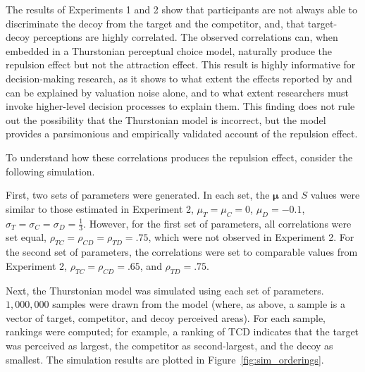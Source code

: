 The results of Experiments 1 and 2 show that participants are not always able to discriminate the decoy from the target and the competitor, and, that target-decoy perceptions are highly correlated. The observed correlations can, when embedded in a Thurstonian perceptual choice model, naturally produce the repulsion effect but not the attraction effect. This result is highly informative for decision-making research, as it shows to what extent the effects reported by \textcite{trueblood2013not} and \textcite{spektorWhenGoodLooks2018b} can be explained by valuation noise alone, and to what extent researchers must invoke higher-level decision processes to explain them. This finding does not rule out the possibility that the Thurstonian model is incorrect, but the model provides a parsimonious and empirically validated account of the repulsion effect.

To understand how these correlations produces the repulsion effect, consider the following simulation. 

First, two sets of parameters were generated. In each set, the $\boldsymbol{\mu}$ and $S$ values were similar to those estimated in Experiment 2, $\mu_{T}=\mu_{C}=0$, $\mu_{D}=-0.1$, $\sigma_{T}=\sigma_{C}=\sigma_{D}=\frac{1}{3}$. However, for the first set of parameters, all correlations were set equal, $\rho_{TC}=\rho_{CD}=\rho_{TD}=.75$, which were not observed in Experiment 2. For the second set of parameters, the correlations were set to comparable values from Experiment 2, $\rho_{TC}=\rho_{CD}=.65$, and $\rho_{TD}=.75$. 

Next, the Thurstonian model was simulated using each set of parameters. $1,000,000$ samples were drawn from the model (where, as above, a sample is a vector of target, competitor, and decoy perceived areas). For each sample, rankings were computed; for example, a ranking of TCD indicates that the target was perceived as largest, the competitor as second-largest, and the decoy as smallest. The simulation results are plotted in Figure~\ref{fig:sim_orderings}. 

